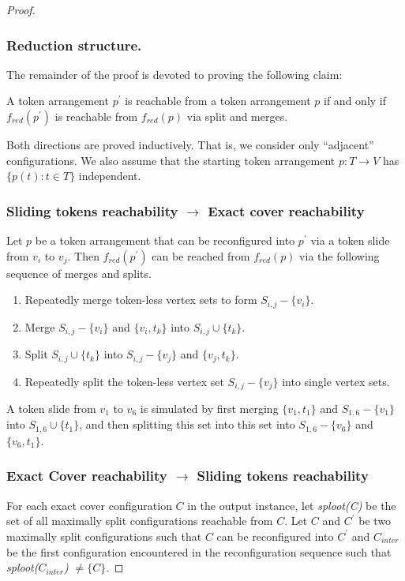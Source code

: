 \begin{proof}
\subsubsection{Reduction structure.}
The remainder of the proof is devoted to proving the following claim:
\begin{claim} A token arrangement $p^{'}$ is reachable from a token arrangement $p$ if and only if $f_{red}(p^{'})$ is reachable from
$f_{red}(p)$ via split and merges.
\end{claim}
Both directions are proved inductively. That is, we consider only “adjacent” configurations. We also assume that the starting token
arrangement $p : T \rightarrow V$ has $ \{p(t) : t \in T \}$ independent.

\subsubsection{Sliding tokens reachability $\rightarrow$ Exact cover reachability}
Let $p$ be a token arrangement that can be reconfigured into $p^{'}$ via a token slide from $v_i$ to $v_j$. Then $f_{red}(p^{'})$ can be reached
from $f_{red}(p)$ via the following sequence of merges and splits.
\begin{enumerate}
  \item Repeatedly merge token-less vertex sets to form $S_{i,j}-\{v_i\}$.
  \item Merge $S_{i,j} - \{v_i\}$ and $\{v_i, t_k\}$ into $S_{i,j} \cup \{t_k\}$.
  \item Split $S_{i,j} \cup \{t_k\}$ into $S_{i,j} - \{v_j\}$ and $\{v_j, t_k\}$.
  \item Repeatedly split the token-less vertex set $S_{i,j}-\{v_j\}$ into single vertex sets.
\end{enumerate}

\begin{example}A token slide from $v_1$ to $v_6$ is simulated by first merging $\{v_1, t_1\}$ and $S_{1,6} - \{v_1\}$ into $S_{1,6} \cup \{t_1\}$,
and then splitting this set into this set into $S_{1,6} - \{v_6\}$ and $\{v_6, t_1\}$.
\end{example}

\subsubsection{Exact Cover reachability $\rightarrow$ Sliding tokens reachability}\label{subsubsection:backward}

For each exact cover configuration $C$ in the output instance, let \textit{sploot(C)} be the set of all maximally split configurations reachable
from $C$. Let $C$ and $C^{'}$ be two maximally split configurations such that $C$ can be reconfigured into $C^{'}$ and $C_{inter}$ be the first
configuration encountered in the reconfiguration sequence such that \textit{sploot($C_{inter}$)} $\neq \{C\}$.


\end{proof}
